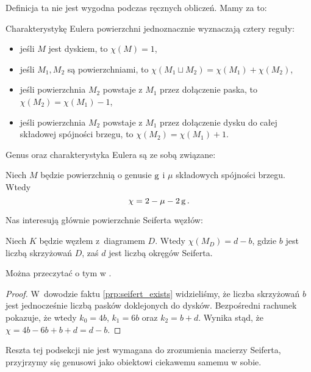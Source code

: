 Definicja ta nie jest wygodna podczas ręcznych obliczeń.
Mamy za to:

\begin{proposition}
    Charakterystykę Eulera powierzchni jednoznacznie wyznaczają cztery reguły:
    \begin{itemize}
        \item jeśli $M$ jest dyskiem, to $\chi(M) = 1$,
        \item jeśli $M_1, M_2$ są powierzchniami, to $\chi(M_1 \sqcup M_2) = \chi(M_1) + \chi(M_2)$,
        \item jeśli powierzchnia $M_2$ powstaje z $M_1$ przez dołączenie paska, to $\chi(M_2) = \chi(M_1) - 1$,
        \item jeśli powierzchnia $M_2$ powstaje z $M_1$ przez dołączenie dysku do całej składowej spójności brzegu, to $\chi(M_2) = \chi(M_1) + 1$.
    \end{itemize}
\end{proposition}

Genus oraz charakterystyka Eulera są ze sobą związane:

\begin{proposition}
    Niech $M$ będzie powierzchnią o genusie $\operatorname{g}$ i $\mu$ składowych spójności brzegu.
    Wtedy
    \begin{equation}
        \chi = 2 - \mu - 2\operatorname{g}.
    \end{equation}
\end{proposition}

Nas interesują głównie powierzchnie Seiferta węzłów:

\begin{proposition}
    \label{prp:seifert_euler_characteristics}
    Niech $K$ będzie węzłem z~diagramem $D$.
    Wtedy $\chi(M_D) = d - b$, gdzie $b$ jest liczbą skrzyżowań $D$, zaś $d$ jest liczbą okręgów Seiferta.
\end{proposition}

Można przeczytać o tym w \cite[s. 82]{murasugi96}.

\begin{proof}
    W~dowodzie faktu \ref{prp:seifert_exists} widzieliśmy, że liczba skrzyżowań $b$ jest jednocześnie liczbą pasków doklejonych do dysków.
    Bezpośredni rachunek pokazuje, że wtedy $k_0 = 4b$, $k_1 = 6b$ oraz $k_2 = b+d$.
    Wynika stąd, że $\chi = 4b - 6b + b + d = d - b$.
\end{proof}

Reszta tej podsekcji nie jest wymagana do zrozumienia macierzy Seiferta, przyjrzymy się genusowi jako obiektowi ciekawemu samemu w sobie.

